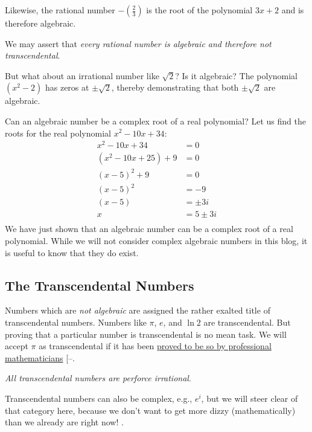 \documentclass[
  a4paper,
]{article}
\begin{document}
Likewise, the rational number \(-(\frac{2}{3})\) is the root of the
polynomial \(3x + 2\) and is therefore algebraic.

We may assert that \emph{every rational number is algebraic and
therefore not transcendental}.

But what about an irrational number like \(\sqrt{2}\)? Is it algebraic?
The polynomial \((x^2 - 2)\) has zeros at \(\pm\sqrt{2}\), thereby
demonstrating that both \(\pm\sqrt{2}\) are algebraic.

Can an algebraic number be a complex root of a real polynomial? Let us
find the roots for the real polynomial \(x^2 - 10x +34\): \[
\begin{aligned}
x^2 - 10x + 34 &= 0\\
(x^2 -10x + 25) + 9 &= 0\\
(x - 5)^2 + 9 &= 0\\
(x - 5)^2 &= -9\\
(x - 5) &= \pm3i\\
x &= 5 \pm 3i\\
\end{aligned}
\] We have just shown that an algebraic number can be a complex root of
a real polynomial. While we will not consider complex algebraic numbers
in this blog, it is useful to know that they do exist.

\subsection{The Transcendental
Numbers}\label{the-transcendental-numbers}

Numbers which are \emph{not algebraic} are assigned the rather exalted
title of transcendental numbers. Numbers like
\href{https://www.wolframalpha.com/input?i=is+pi+transcendental}{\(\pi\)},
\href{https://www.wolframalpha.com/input?i=is+e+transcendental}{\(e\)},
and
\href{https://www.wolframalpha.com/input?i=is+ln\%282\%29+transcendental}{\(\ln 2\)}
are transcendental. But proving that a particular number is
transcendental is no mean task. We will accept \(\pi\) as transcendental
if it has been
\href{https://fermatslibrary.com/s/the-transcendence-of-pi}{proved to be
so by professional mathematicians}
{[}--\citeproc{ref-morris-jones-pearson-2022}{10}{]}.

\emph{All transcendental numbers are perforce irrational}.

Transcendental numbers can also be complex, e.g., \(e^{i}\), but we will
steer clear of that category here, because we don't want to get more
dizzy (mathematically) than we already are right now! 
\normalfont.
\end{document}
